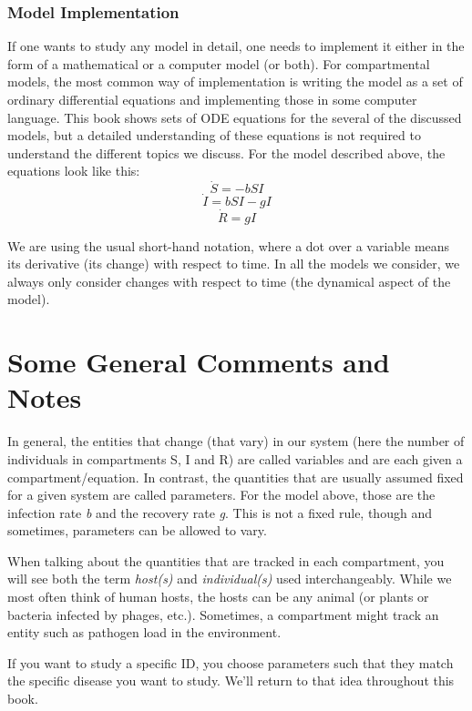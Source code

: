\documentclass[]{book}
\theoremstyle{definition}
\theoremstyle{definition}
\theoremstyle{definition}
\theoremstyle{remark}
\begin{document}
\subsubsection{Model Implementation}\label{myadvancedbox}

If one wants to study any model in detail, one needs to implement it
either in the form of a mathematical or a computer model (or both). For
compartmental models, the most common way of implementation is writing
the model as a set of ordinary differential equations and implementing
those in some computer language. This book shows sets of ODE equations
for the several of the discussed models, but a detailed understanding of
these equations is not required to understand the different topics we
discuss. For the model described above, the equations look like this:
\[\dot S = -bSI\] \[\dot I = bSI - gI\] \[\dot R = gI\]

We are using the usual short-hand notation, where a dot over a variable
means its derivative (its change) with respect to time. In all the
models we consider, we always only consider changes with respect to time
(the dynamical aspect of the model).

\section{Some General Comments and
Notes}\label{some-general-comments-and-notes}

In general, the entities that change (that vary) in our system (here the
number of individuals in compartments S, I and R) are called variables
and are each given a compartment/equation. In contrast, the quantities
that are usually assumed fixed for a given system are called parameters.
For the model above, those are the infection rate \emph{b} and the
recovery rate \emph{g}. This is not a fixed rule, though and sometimes,
parameters can be allowed to vary.

When talking about the quantities that are tracked in each compartment,
you will see both the term \emph{host(s)} and \emph{individual(s)} used
interchangeably. While we most often think of human hosts, the hosts can
be any animal (or plants or bacteria infected by phages, etc.).
Sometimes, a compartment might track an entity such as pathogen load in
the environment.

If you want to study a specific ID, you choose parameters such that they
match the specific disease you want to study. We'll return to that idea
throughout this book.
\end{document}
